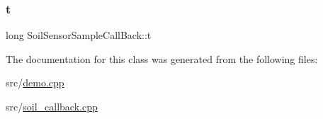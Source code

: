 \subsubsection{\texorpdfstring{t}{t}}
{\footnotesize\ttfamily long Soil\+Sensor\+Sample\+Call\+Back\+::t}



The documentation for this class was generated from the following files\+:\begin{DoxyCompactItemize}
\item 
src/\hyperlink{demo_8cpp}{demo.\+cpp}\item 
src/\hyperlink{soil__callback_8cpp}{soil\+\_\+callback.\+cpp}\end{DoxyCompactItemize}

